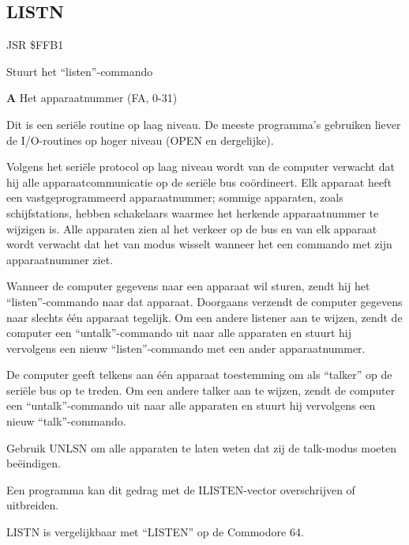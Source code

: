 \subsection{LISTN}
\label{KERNAL Jump Table!LISTN}
\begin{description}[leftmargin=2cm,style=nextline]
    \item [Adres:] JSR \$FFB1    \item [Omschrijving:] Stuurt het ``listen''-commando    \item [Invoer:]        \textbf{A} Het apparaatnummer (FA, 0-31)    \item [Opmerkingen:]        Dit is een seriële routine op laag niveau. De meeste programma's gebruiken liever de I/O-routines op hoger niveau (OPEN en dergelijke).

        Volgens het seriële protocol op laag niveau wordt van de computer verwacht dat hij alle apparaatcommunicatie op de seriële bus coördineert. Elk apparaat heeft een vastgeprogrammeerd apparaatnummer; sommige apparaten, zoals schijfstations, hebben schakelaars waarmee het herkende apparaatnummer te wijzigen is. Alle apparaten zien al het verkeer op de bus en van elk apparaat wordt verwacht dat het van modus wisselt wanneer het een commando met zijn apparaatnummer ziet.

        Wanneer de computer gegevens naar een apparaat wil sturen, zendt hij het ``listen''-commando naar dat apparaat. Doorgaans verzendt de computer gegevens naar slechts één apparaat tegelijk. Om een andere listener aan te wijzen, zendt de computer een ``untalk''-commando uit naar alle apparaten en stuurt hij vervolgens een nieuw ``listen''-commando met een ander apparaatnummer.

        De computer geeft telkens aan één apparaat toestemming om als ``talker'' op de seriële bus op te treden. Om een andere talker aan te wijzen, zendt de computer een ``untalk''-commando uit naar alle apparaten en stuurt hij vervolgens een nieuw ``talk''-commando.

        Gebruik UNLSN om alle apparaten te laten weten dat zij de talk-modus moeten beëindigen.

        Een programma kan dit gedrag met de ILISTEN-vector overschrijven of uitbreiden.

        LISTN is vergelijkbaar met ``LISTEN'' op de Commodore 64.

    \item [Voorbeeld:]
\end{description}


